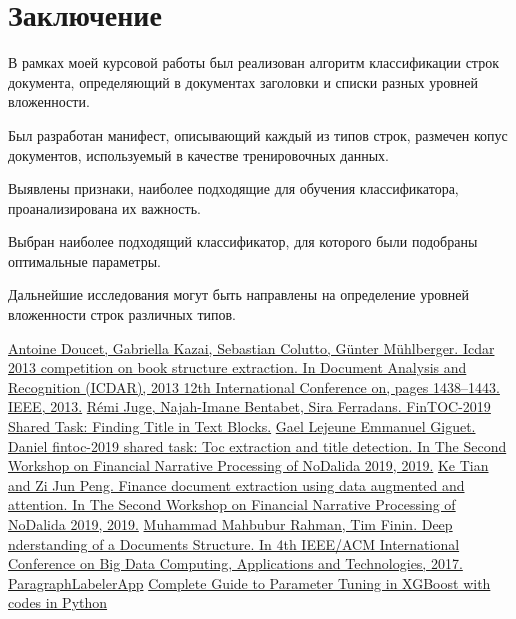 \documentclass[a4paper,12pt]{article}
\begin{document}
\section*{Заключение}

В рамках моей курсовой работы был реализован алгоритм классификации строк документа, определяющий в документах заголовки и списки разных уровней вложенности.

Был разработан манифест, описывающий каждый из типов строк, размечен копус документов, используемый в качестве тренировочных данных.

Выявлены признаки, наиболее подходящие для обучения классификатора, проанализирована их важность. 

Выбран наиболее подходящий классификатор, для которого были подобраны оптимальные параметры.

Дальнейшие исследования могут быть направлены на определение уровней вложенности строк различных типов.

\newpage
 
 \begin{thebibliography}{}
     \href{https://hal.archives-ouvertes.fr/hal-01073396/document}{Antoine Doucet, Gabriella Kazai, Sebastian Colutto, Günter Mühlberger. Icdar 2013 competition on book structure extraction. In Document Analysis and Recognition (ICDAR), 2013 12th International Conference on, pages 1438–1443. IEEE, 2013.}
     \href{https://www.aclweb.org/anthology/W19-6407.pdf}{Rémi Juge, Najah-Imane Bentabet, Sira Ferradans. FinTOC-2019 Shared Task: Finding Title in Text Blocks.}
     \href{https://www.aclweb.org/anthology/W19-6409.pdf}{Gael Lejeune Emmanuel Giguet. Daniel fintoc-2019 shared task: Toc extraction and title detection. In The Second Workshop on Financial Narrative Processing of NoDalida 2019, 2019.}
     \href{http://www.ep.liu.se/ecp/165/001/ecp19165001.pdf}{Ke Tian and Zi Jun Peng. Finance document extraction using data augmented and attention. In The Second Workshop on Financial Narrative Processing of NoDalida 2019, 2019.}
     \href{https://dl.acm.org/doi/pdf/10.1145/3148055.3148080}{Muhammad Mahbubur Rahman, Tim Finin. Deep nderstanding of a Documents Structure. In 4th IEEE/ACM International Conference on Big Data Computing, Applications and Technologies, 2017.}
     \href{https://github.com/dronperminov/ParagraphLabelerApp}{ParagraphLabelerApp}
     \href{https://www.analyticsvidhya.com/blog/2016/03/complete-guide-parameter-tuning-xgboost-with-codes-python/}{Complete Guide to Parameter Tuning in XGBoost with codes in Python}
\end{thebibliography}
\end{document}
